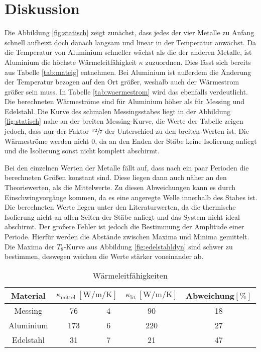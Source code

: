 \section{Diskussion}
\label{sec:Diskussion}
Die Abbildung \ref{fig:statisch} zeigt zunächst, dass jedes der vier Metalle
zu Anfang schnell aufheizt doch danach langsam und linear in der Temperatur
anwächst. Da die Temperatur von Aluminium schneller wächst als die der anderen
Metalle, ist Aluminium die höchste Wärmeleitfähigkeit $κ$ zuzuordnen.
Dies lässt sich bereits aus Tabelle \ref{tab:mateig} entnehmen. Bei Aluminium
ist außerdem die Änderung der Temperatur bezogen auf den Ort größer, weshalb
auch der Wärmestrom größer sein muss. In Tabelle \ref{tab:waermestrom} wird das
ebenfalls verdeutlicht. Die berechneten Wärmeströme sind für Aluminium höher
als für Messing und Edelstahl. Die Kurve des schmalen Messingsstabes liegt in
der Abbildung \ref{fig:statisch} nahe an der breiten Messing-Kurve, die Werte
der Tabelle zeigen jedoch, dass nur der Faktor $\sfrac{12}{7}$ der Unterschied
zu den breiten Werten ist. Die Wärmeströme werden nicht 0, da an den Enden der
Stäbe keine Isolierung anliegt und die Isolierung sonst nicht komplett abschirmt.

Bei den einzelnen Werten der Metalle fällt auf,
dass nach ein paar Perioden die berechneten Größen konstant sind.
Diese liegen dann auch näher an den Theoriewerten, als die Mittelwerte.
Zu diesen Abweichungen kann es durch Einschwingvorgänge kommen,
da es eine angeregte Welle innerhalb des Stabes ist.
Die berechneten Werte liegen unter den Literaturwerten, da die thermische Isolierung
nicht an allen Seiten der Stäbe anliegt und das System nicht ideal abschirmt.
Der größere Fehler ist jedoch die Bestimmung der Amplitude einer Periode.
Hierfür werden die Abstände zwischen Maxima und Minima gemittelt.
Die Maxima der $T_8$-Kurve aus Abbildung \ref{fig:edelstahldyn} sind schwer zu
bestimmen, deswegen weichen die Werte stärker voneinander ab.

\begin{table}
      \centering
      \caption{Wärmeleitfähigkeiten}
      \label{tab:leitergebnisse}
      \begin{tabular}{c S[table-format=3.0] @{${}\pm{}$} S[table-format=1.0] S[table-format=3.0] S[table-format=2.0]}
            \toprule
            {Material}
            & 
            & {$κ_\text{lit}\:[\si{\watt\per\metre\per\kelvin}]$}
            & {Abweichung\:$[\si{\percent}]$} \\
            \midrule
            Messing   &  76 & 4 &  90 & 18 \\
            Aluminium & 173 & 6 & 220 & 27 \\
            Edelstahl &  31 & 7 &  21 & 47 \\
            \bottomrule
      \end{tabular}
\end{table}
